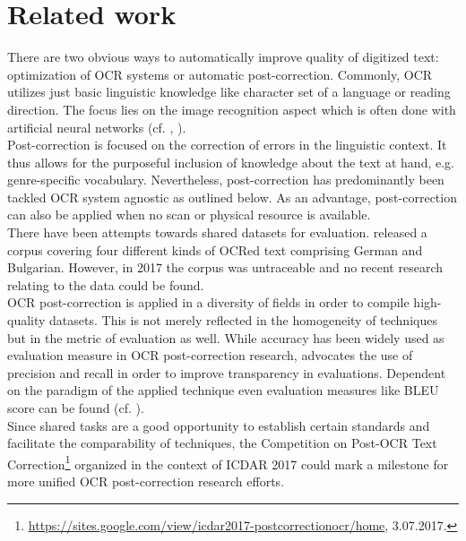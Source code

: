 \documentclass[11pt,letterpaper]{article}
\begin{document}
\section{Related work}
\label{sec:relwork}
There are two obvious ways to automatically improve quality of digitized text: optimization of OCR systems or automatic post-correction.
Commonly, OCR utilizes just basic linguistic knowledge like character set of a language or reading direction. The focus 
lies on the image recognition aspect which is often done with artificial neural networks (cf. , ).\\
Post-correction is focused on the correction of errors in the linguistic context. It thus allows for the purposeful inclusion of knowledge about the text at hand, e.g. genre-specific vocabulary. Nevertheless, post-correction has predominantly been tackled OCR system agnostic as outlined below. As an advantage, post-correction can also be applied when no scan or physical resource is available.\\
There have been attempts towards shared datasets for evaluation.  released a corpus covering four different kinds of OCRed text
comprising German and Bulgarian. However, in 2017 the corpus was untraceable and no recent research relating to the data could be found.\\
OCR post-correction is applied in a diversity of fields in order to compile high-quality datasets. This is not merely reflected in the homogeneity of 
techniques but in the metric of evaluation as well. While accuracy has been widely used as evaluation measure in OCR post-correction research,  advocates the use of precision and recall in order to improve transparency in evaluations. 
Dependent on the paradigm of the applied technique even evaluation measures like BLEU score can be found (cf. ).\\
Since shared tasks are a good opportunity to establish certain standards and facilitate the comparability of techniques, the Competition on Post-OCR Text Correction\footnote{\url{https://sites.google.com/view/icdar2017-postcorrectionocr/home}, 3.07.2017.} organized in the context of ICDAR 2017 could mark a milestone for more unified OCR post-correction research efforts.
\end{document}
